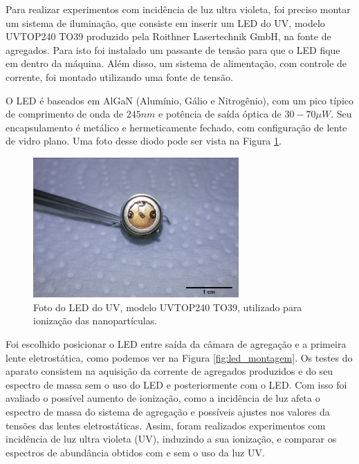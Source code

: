 Para realizar experimentos com incidência de luz ultra violeta, foi preciso montar um sistema de iluminação, que consiste em inserir um LED do UV, modelo UVTOP240 TO39 produzido pela Roithner Lasertechnik GmbH, na fonte de agregados. Para isto foi instalado um passante de tensão para que o LED fique em dentro da máquina. Além disso, um sistema de alimentação, com controle de corrente, foi montado utilizando uma fonte de tensão.

O LED é baseados em AlGaN (Alumínio, Gálio e Nitrogênio), com um pico típico de comprimento de onda de $245 nm$ e potência de saída óptica de $30-70 \mu W$. Seu encapsulamento é metálico e hermeticamente fechado, com configuração de lente de vidro plano. Uma foto desse diodo pode ser vista na Figura \ref{fig:foto_led}.

\begin{figure}
  \centering
  \includegraphics[width=0.7\textwidth]{images/led_scale}
  \caption{ Foto do LED do UV, modelo UVTOP240 TO39, utilizado para ionização das nanopartículas.  }
  \label{fig:foto_led}
\end{figure}


Foi escolhido posicionar o LED entre saída da câmara de agregação e a primeira lente eletrostática, como podemos ver na Figura \ref{fig:led_montagem}. Os testes do aparato consistem na aquisição da corrente de agregados produzidos e do seu espectro de massa sem o uso do LED e posteriormente com o LED. Com isso foi avaliado o possível aumento de ionização, como a incidência de luz afeta o espectro de massa do sistema de agregação e possíveis ajustes nos valores da tensões das lentes eletrostáticas.
Assim, foram realizados experimentos com incidência de luz ultra violeta (UV), induzindo a sua ionização, e comparar os espectros de abundância obtidos com e sem o uso da luz UV. 



